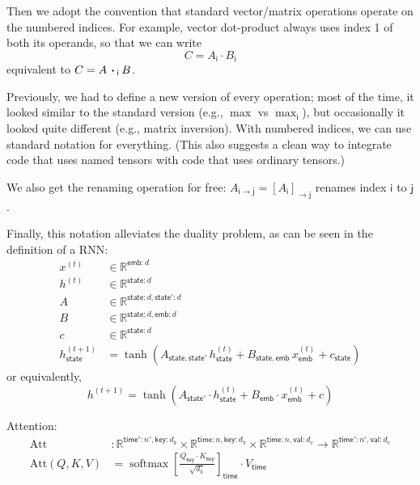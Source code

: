 \documentclass{article}
\newcommand{\name}[1]{\mathsf{#1}}
\newcommand{\ndot}[1]{\mathbin{\mathop{\thinspace\boldsymbol\cdot\thinspace}\displaylimits_{\name{#1}}}}
\DeclareMathOperator*{\softmax}{softmax}
\begin{document}
Then we adopt the convention that standard vector/matrix operations operate on the numbered indices. For example, vector dot-product always uses index 1 of both its operands, so that we can write
\begin{equation*}
C = A_{\name{i}} \cdot B_{\name{i}}
\end{equation*}
equivalent to $C = A \ndot{i} B$. 

Previously, we had to define a new version of every operation; most of the time, it looked similar to the standard version (e.g., $\max$ vs $\max_{\name{i}}$), but occasionally it looked quite different (e.g., matrix inversion). With numbered indices, we can use standard notation for everything.
(This also suggests a clean way to integrate code that uses named tensors with code that uses ordinary tensors.)

We also get the renaming operation for free: $A_{\name{i}\rightarrow\name{j}} = [A_{\name{i}}]_{\rightarrow\name{j}}$ renames index $\name{i}$ to $\name{j}$.

Finally, this notation alleviates the duality problem, as can be seen in the definition of a RNN:
\begin{align*}
x^{(t)} &\in \mathbb{R}^{\name{emb}: d} \\
h^{(t)} &\in \mathbb{R}^{\name{state}: d} \\
A &\in \mathbb{R}^{\name{state}: d, \name{state'}: d} \\
B &\in \mathbb{R}^{\name{state}: d, \name{emb}: d} \\
c &\in \mathbb{R}^{\name{state}: d} \\
h^{(t+1)}_{\name{state}} &= \tanh\left( A_{\name{state},\name{state'}} \, h^{(t)}_{\name{state}} + B_{\name{state},\name{emb}} \, x^{(t)}_{\name{emb}} + c_{\name{state}} \right)
\end{align*}
or equivalently,
\begin{equation*}
h^{(t+1)} = \tanh\left( A_{\name{state'}} \cdot h^{(t)}_{\name{state}} + B_{\name{emb}} \cdot x^{(t)}_{\name{emb}} + c \right)
\end{equation*}

Attention:
\begin{align*}
  \text{Att} &\colon \mathbb{R}^{\name{time'}:n',\name{key}:d_k} \times \mathbb{R}^{\name{time}:n,\name{key}:d_k} \times \mathbb{R}^{\name{time}:n,\name{val}:d_v} \rightarrow \mathbb{R}^{\name{time'}:n',\name{val}:d_v} \\
  \text{Att}(Q,K,V) &= \softmax \left[ \frac{Q_{\name{key}} \cdot K_\name{key}}{\sqrt{d_k}} \right]_{\name{time}} \cdot V_{\name{time}}
\end{align*}
\end{document}
